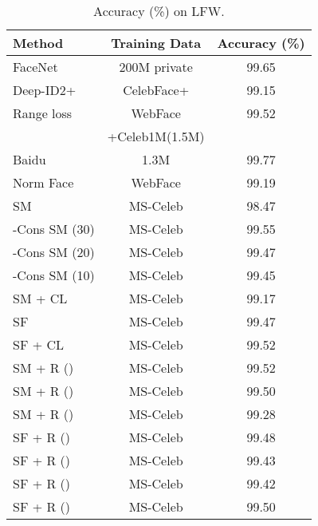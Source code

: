 \documentclass[10pt,twocolumn,letterpaper]{article}
\begin{document}
\begin{table}\small
\caption{Accuracy (\%) on LFW. } \centering \begin{tabular}{l c c } 

\hline\hline 


Method & Training Data   & Accuracy (\%)   \\
\hline FaceNet \cite{schroff2015facenet}  & 200M private  & 99.65   \\ Deep-ID2+  \cite{sun2014deep}  &  CelebFace+	& 99.15  \\
Range loss \cite{ZhangFWL016}  &  WebFace &  99.52 \\
  &  +Celeb1M(1.5M) &  \\
Baidu \cite{liu2015targeting}  &  1.3M &  99.77 \\


Norm Face \cite{Wang2017NormFace} & WebFace  &   99.19 \\

\hline
\hline

SM    &   MS-Celeb     &   98.47  \\
-Cons SM (30) \cite{ranjan2017l2}   &   MS-Celeb     &   99.55  \\ 
-Cons SM (20) \cite{ranjan2017l2}   &   MS-Celeb     &   99.47  \\ 
-Cons SM (10) \cite{ranjan2017l2}   &   MS-Celeb     &   99.45  \\ 
SM + CL \cite{wen2016discriminative}   &  MS-Celeb     &     99.17   \\ 
SF   \cite{liu2017sphereface}   &   MS-Celeb     &   99.47   \\
SF + CL \cite{wen2016discriminative, liu2017sphereface}  &  MS-Celeb     &   99.52   \\


\hline
SM + R  ()    &  MS-Celeb     & 99.52    \\
SM + R  ()   &  MS-Celeb     &  99.50  \\
SM + R  ()  & MS-Celeb   &    99.28    \\ 
\hline
SF + R  ()   &   MS-Celeb     &    99.48  \\ 
SF + R  ()   &   MS-Celeb     &    99.43 \\ 
SF + R  ()   &   MS-Celeb     &   99.42 \\ 
SF + R  ()   &  MS-Celeb     &  99.50   \\ 

\hline
\end{tabular}
\label{tab_lfw} \end{table}
\end{document}
